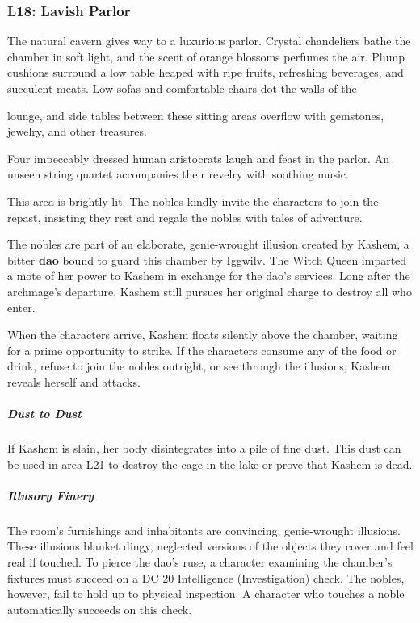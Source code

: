 \documentclass[10pt,a4paper,twoside,bg=print,twocolumn,openany,nodeprecatedcode]{dndbook}
\begin{document}
\subsubsection{L18: Lavish Parlor}
\begin{DndReadAloud}{}
The natural cavern gives way to a luxurious parlor. Crystal chandeliers bathe the chamber in soft light, and the scent of orange blossoms perfumes the air. Plump cushions surround a low table heaped with ripe fruits, refreshing beverages, and succulent meats. Low sofas and comfortable chairs dot the walls of the

lounge, and side tables between these sitting areas overflow with gemstones, jewelry, and other treasures.

Four impeccably dressed human aristocrats laugh and feast in the parlor. An unseen string quartet accompanies their revelry with soothing music.

\end{DndReadAloud}

This area is brightly lit. The nobles kindly invite the characters to join the repast, insisting they rest and regale the nobles with tales of adventure.

The nobles are part of an elaborate, genie-wrought illusion created by Kashem, a bitter \textbf{dao} bound to guard this chamber by Iggwilv. The Witch Queen imparted a mote of her power to Kashem in exchange for the dao's services. Long after the archmage's departure, Kashem still pursues her original charge to destroy all who enter.

When the characters arrive, Kashem floats silently above the chamber, waiting for a prime opportunity to strike. If the characters consume any of the food or drink, refuse to join the nobles outright, or see through the illusions, Kashem reveals herself and attacks.

\subparagraph{Dust to Dust}
If Kashem is slain, her body disintegrates into a pile of fine dust. This dust can be used in area L21 to destroy the cage in the lake or prove that Kashem is dead.

\subparagraph{Illusory Finery}
The room's furnishings and inhabitants are convincing, genie-wrought illusions. These illusions blanket dingy, neglected versions of the objects they cover and feel real if touched. To pierce the dao's ruse, a character examining the chamber's fixtures must succeed on a DC 20 Intelligence (Investigation) check. The nobles, however, fail to hold up to physical inspection. A character who touches a noble automatically succeeds on this check.
\end{document}
